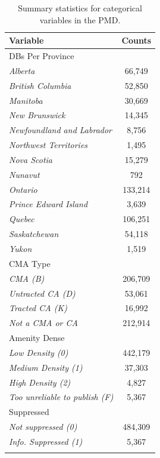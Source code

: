 \documentclass[11pt, a4paper]{article}
\begin{document}
\begin{longtable}{|l|c|}
\hline
\textbf{Variable}  & \textbf{Counts}  \\
\hline
{DBs Per Province} &  \\
\indent\indent \textit{Alberta} & 66,749 \\
\indent\indent \textit{British Columbia} & 52,850 \\
\indent\indent \textit{Manitoba} & 30,669 \\
\indent\indent \textit{New Brunswick} & 14,345 \\
\indent\indent \textit{Newfoundland and Labrador} & 8,756 \\
\indent\indent \textit{Northwest Territories} & 1,495 \\
\indent\indent \textit{Nova Scotia} & 15,279 \\
\indent\indent \textit{Nunavut} & 792 \\
\indent\indent \textit{Ontario} & 133,214 \\
\indent\indent \textit{Prince Edward Island} & 3,639 \\
\indent\indent \textit{Quebec} &  106,251 \\
\indent\indent \textit{Saskatchewan} & 54,118 \\
\indent\indent \textit{Yukon} & 1,519 \\
\hline

{CMA Type} &  \\
\indent\indent \textit{CMA (B)} & 206,709 \\
\indent\indent \textit{Untracted CA (D)} & 53,061 \\
\indent\indent \textit{Tracted CA (K)} & 16,992 \\
\indent\indent \textit{Not a CMA or CA} & 212,914 \\
\hline

{Amenity Dense} &  \\
\indent\indent \textit{Low Density (0)} & 442,179 \\
\indent\indent \textit{Medium Density (1)} & 37,303 \\
\indent\indent \textit{High Density (2)} & 4,827 \\
\indent\indent \textit{Too unreliable to publish (F)} & 5,367 \\
\hline

{Suppressed} &  \\
\indent\indent \textit{Not suppressed (0)} & 484,309 \\
\indent\indent \textit{Info. Suppressed (1)} & 5,367 \\
\hline

\caption[Summary of cateogrical variables]{Summary statistics for categorical variables in the PMD.}\label{categorical}
\end{longtable}
\end{document}
